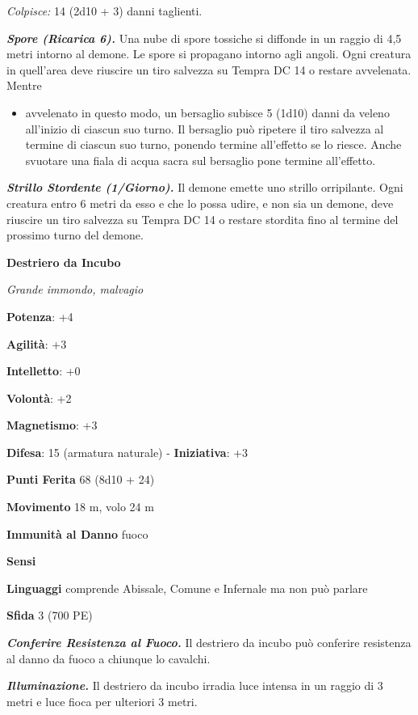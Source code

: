 \begin{multicols}{2}
\emph{Colpisce:} 14 (2d10 + 3) danni taglienti.

\emph{\textbf{Spore (Ricarica 6).}} Una nube di spore tossiche si
diffonde in un raggio di 4,5 metri intorno al demone. Le spore si
propagano intorno agli angoli. Ogni creatura in quell'area deve riuscire
un tiro salvezza su Tempra DC 14 o restare avvelenata. Mentre


\begin{itemize}
\item
  avvelenato in questo modo, un bersaglio subisce 5 (1d10) danni da
  veleno all'inizio di ciascun suo turno. Il bersaglio può ripetere il
  tiro salvezza al termine di ciascun suo turno, ponendo termine
  all'effetto se lo riesce. Anche svuotare una fiala di acqua sacra sul
  bersaglio pone termine all'effetto.
\end{itemize}


\emph{\textbf{Strillo Stordente (1/Giorno).}} Il demone emette uno
strillo orripilante. Ogni creatura entro 6 metri da esso e che lo possa
udire, e non sia un demone, deve riuscire un tiro salvezza su Tempra DC 14 o restare stordita fino al termine del prossimo turno
del demone.


\textbf{Destriero da Incubo}

\emph{Grande immondo, malvagio}

\textbf{Potenza}: +4

\textbf{Agilità}: +3

\textbf{Intelletto}: +0

\textbf{Volontà}: +2

\textbf{Magnetismo}: +3

\textbf{Difesa}: 15 (armatura naturale) - \textbf{Iniziativa}: +3

\textbf{Punti Ferita} 68 (8d10 + 24)

\textbf{Movimento} 18 m, volo 24 m

\textbf{Immunità al Danno} fuoco

\textbf{Sensi} 

\textbf{Linguaggi} comprende Abissale, Comune e Infernale ma non può
parlare

\textbf{Sfida} 3 (700 PE)\smallskip

\emph{\textbf{Conferire Resistenza al Fuoco.}} Il destriero da incubo
può conferire resistenza al danno da fuoco a chiunque lo cavalchi.

\emph{\textbf{Illuminazione.}} Il destriero da incubo irradia luce
intensa in un raggio di 3 metri e luce fioca per ulteriori 3 metri.


\end{multicols}
